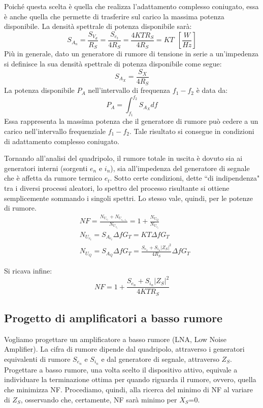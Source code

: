 Poiché questa scelta è quella che realizza l'adattamento complesso coniugato, essa è anche quella
che permette di trasferire sul carico la massima potenza disponibile. La densità spettrale di potenza disponibile sarà:
\[S_{A_n} = \frac{S_{V_d}}{R_S} = \frac{S_{e_t}}{4R_S} = \frac{4KTR_S}{4R_S} = KT~~\left[\frac{W}{Hz}\right]\]
Più in generale, dato un generatore di rumore di tensione in serie a un'impedenza si definisce la sua
densità spettrale di potenza disponibile come segue:
\[S_{A_X} = \frac{S_X}{4R_S}\]
La potenza disponibile $P_A$ nell'intervallo di frequenza $f_1-f_2$ è data da:
\[P_A = \int_{f_1}^{f_2} S_{A_X} df \]
Essa rappresenta la massima potenza che il generatore di rumore può cedere a un carico nell'intervallo frequenziale $f_1-f_2$. Tale risultato si consegue in condizioni di adattamento complesso coniugato.

Tornando all'analisi del quadripolo, il rumore totale in uscita è dovuto sia ai generatori interni (sorgenti $e_n$ e $i_n$), sia all'impedenza del generatore di segnale che è affetta da rumore termico $e_t$.
Sotto certe condizioni, dette ``di indipendenza" tra i diversi processi aleatori, lo spettro del processo risultante si ottiene semplicemente sommando i singoli spettri. Lo stesso vale, quindi, per le 	potenze di rumore.
\begin{align*}
&NF = \frac{N_{U_{e_t}} + N_{U_{e_n, i_n}}}{N_{U_{e_t}}} = 1+ \frac{N_{U_Q}}{N_{U_{e_t}}}
\\
&N_{U_{e_t}} = S_{A_{e_t}} \Delta f G_T = KT \Delta f G_T\\
&N_{U_Q} = S_{A_Q} \Delta f G_T =\frac{S_{e_n} + S_{i_n}|Z_S|^2}{4R_S} \Delta f G_T
\end{align*}

Si ricava infine:
\[NF = 1 + \frac{S_{e_n} + S_{i_n}|Z_S|^2}{4KTR_S}\]

\subsection{Progetto di amplificatori a basso rumore}
Vogliamo progettare un amplificatore a basso rumore (LNA, Low Noise Amplifier). La cifra di rumore dipende dal quadripolo, attraverso i generatori equivalenti di rumore $S_{e_n}$ e $S_{i_n}$ e dal generatore di segnale, attraverso $Z_S$. Progettare a basso rumore, una volta scelto il dispositivo attivo, equivale a individuare la terminazione ottima per quando riguarda il rumore, ovvero, quella che minimizza NF. Procediamo,
quindi, alla ricerca del minimo di NF al variare di $Z_S$, osservando che, certamente, NF sarà minimo per
$X_S$=0.

